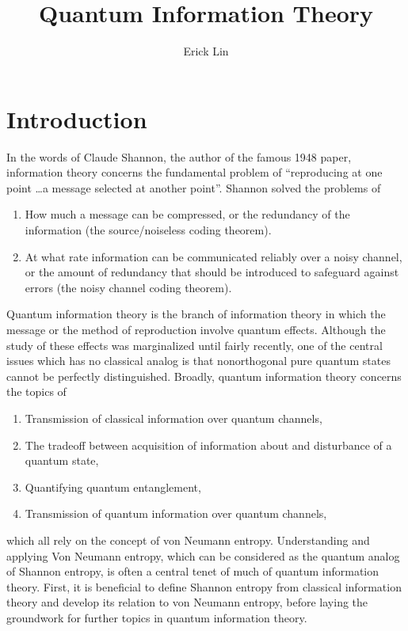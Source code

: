 \documentclass[a4paper, 12pt]{article}
\title{\vspace{0cm} Quantum Information Theory}
\author{Erick Lin}
\numberwithin{equation}{section}
\numberwithin{figure}{section}
\theoremstyle{definition}
\begin{document}
    \maketitle

    \section{Introduction}
    In the words of Claude Shannon, the author of the famous 1948 paper, information theory concerns the fundamental problem of ``reproducing at one point \dots a message selected at another point''. Shannon solved the problems of
    \begin{enumerate}
        \item
            How much a message can be compressed, or the redundancy of the information (the source/noiseless coding theorem).

        \item
            At what rate information can be communicated reliably over a noisy channel, or the amount of redundancy that should be introduced to safeguard against errors (the noisy channel coding theorem).
    \end{enumerate}
    Quantum information theory is the branch of information theory in which the message or the method of reproduction involve quantum effects. Although the study of these effects was marginalized until fairly recently, one of the central issues which has no classical analog is that nonorthogonal pure quantum states cannot be perfectly distinguished. Broadly, quantum information theory concerns the topics of
    \begin{enumerate}
        \item
            Transmission of classical information over quantum channels,

        \item
            The tradeoff between acquisition of information about and disturbance of a quantum state,

        \item
            Quantifying quantum entanglement,

        \item
            Transmission of quantum information over quantum channels,
    \end{enumerate}
    which all rely on the concept of von Neumann entropy. Understanding and applying Von Neumann entropy, which can be considered as the quantum analog of Shannon entropy, is often a central tenet of much of quantum information theory. First, it is beneficial to define Shannon entropy from classical information theory and develop its relation to von Neumann entropy, before laying the groundwork for further topics in quantum information theory.
\end{document}

